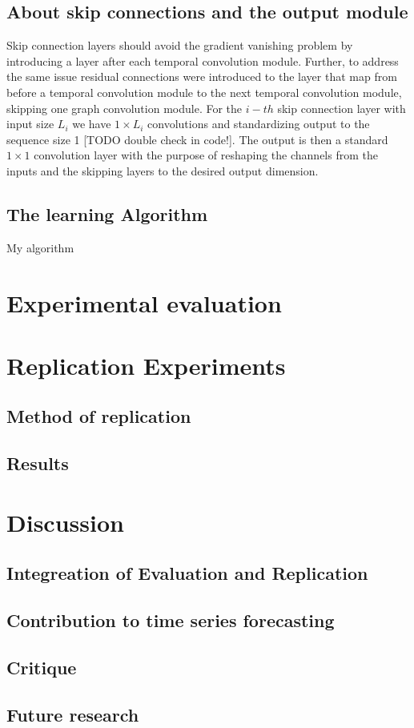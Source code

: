 \documentclass[letterpaper,twocolumn,12pt]{article}
\begin{document}
    \subsection{About skip connections and the output module}
    Skip connection layers should avoid the gradient vanishing problem by introducing a layer after each temporal convolution module.
    Further, to address the same issue residual connections were introduced to the layer that map from before a temporal convolution module to the next temporal convolution module, skipping one graph convolution module.
    For the $i-th$ skip connection layer with input size $L_i$ we have  $1 \times L_i$ convolutions and standardizing output to the sequence size 1 [TODO double check in code!].
    The output is then a standard $ 1 \times 1$ convolution layer with the purpose of reshaping the channels from the inputs and the skipping layers to the desired output dimension.

    \subsection{The learning Algorithm}

    \begin{algorithm}
        \caption{My algorithm}\label{euclid}
    \end{algorithm}


    \section{Experimental evaluation}


    \section{Replication Experiments}

    \subsection{Method of replication}

    \subsection{Results}


    \section{Discussion}

    \subsection{Integreation of Evaluation and Replication}

    \subsection{Contribution to time series forecasting}

    \subsection{Critique}
    \subsection{Future research}

    {\footnotesize 
    }


    \theendnotes
\end{document}
